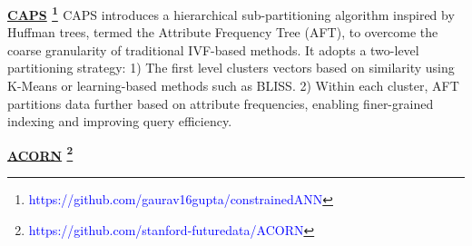 \documentclass[sigconf, nonacm]{acmart}
\begin{document}
{	
	\noindent\textbf{\underline{CAPS} \footnote{\textcolor{blue}{https://github.com/gaurav16gupta/constrainedANN}} \cite{CAPS}}
	CAPS introduces a hierarchical sub-partitioning algorithm inspired by Huffman trees, termed the Attribute Frequency Tree (AFT), to overcome the coarse granularity of traditional IVF-based methods. It adopts a two-level partitioning strategy:  
	1) The first level clusters vectors based on similarity using K-Means or learning-based methods such as BLISS. 2) Within each cluster, AFT partitions data further based on attribute frequencies, enabling finer-grained indexing and improving query efficiency.
	
	\noindent\textbf{\underline{ACORN} \footnote{\textcolor{blue}{https://github.com/stanford-futuredata/ACORN}} \cite{ACORN}}
}
\end{document}
